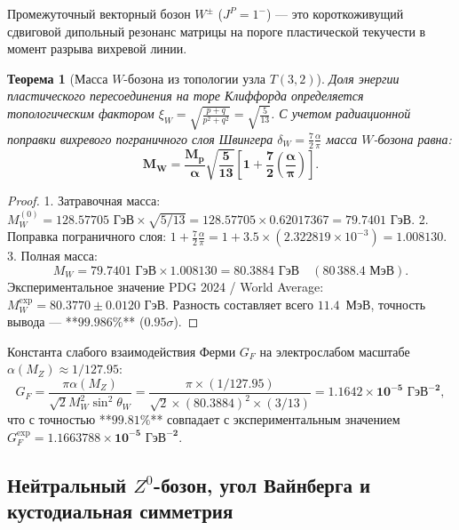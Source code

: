 \documentclass[11pt,a4paper,oneside]{article}
\theoremstyle{plain}
\newtheorem{theorem}{Теорема}[section]
\theoremstyle{definition}
\theoremstyle{remark}
\numberwithin{equation}{section}
\begin{document}
	Промежуточный векторный бозон $W^\pm$ ($J^P = 1^-$) — это короткоживущий сдвиговой дипольный резонанс матрицы на пороге пластической текучести в момент разрыва вихревой линии.
	
	\begin{theorem}[Масса $W$-бозона из топологии узла $T(3,2)$]
		Доля энергии пластического пересоединения на торе Клиффорда определяется топологическим фактором $\xi_W = \sqrt{\frac{p+q}{p^2+q^2}} = \sqrt{\frac{5}{13}}$. С учетом радиационной поправки вихревого пограничного слоя Швингера $\delta_W = \frac{7}{2}\frac{\alpha}{\pi}$ масса $W$-бозона равна:
		\begin{equation}
			\mathbf{M_W = \frac{M_p}{\alpha} \sqrt{\frac{5}{13}} \left[ 1 + \frac{7}{2}\left(\frac{\alpha}{\pi}\right) \right]}.
			\label{eq:w_boson_mass}
		\end{equation}
	\end{theorem}
	
	\begin{proof}
		1. Затравочная масса: $M_W^{(0)} = 128.57705 \text{ ГэВ} \times \sqrt{5/13} = 128.57705 \times 0.62017367 = \mathbf{79.7401 \text{ ГэВ}}$.
		2. Поправка пограничного слоя: $1 + \frac{7}{2}\frac{\alpha}{\pi} = 1 + 3.5 \times (2.322819 \times 10^{-3}) = 1.008130$.
		3. Полная масса:
		\begin{equation}
			M_W = 79.7401 \text{ ГэВ} \times 1.008130 = \mathbf{80.3884 \text{ ГэВ}} \quad (80\,388.4 \text{ МэВ}).
		\end{equation}
		Экспериментальное значение PDG 2024 / World Average: $M_W^{\text{exp}} = \mathbf{80.3770 \pm 0.0120 \text{ ГэВ}}$. Разность составляет всего $11.4$~МэВ, точность вывода — **$99.986\%$** ($0.95\sigma$).
	\end{proof}
	
	Константа слабого взаимодействия Ферми $G_F$ на электрослабом масштабе $\alpha(M_Z) \approx 1/127.95$:
	\begin{equation}
		G_F = \frac{\pi \alpha(M_Z)}{\sqrt{2} M_W^2 \sin^2\theta_W} = \frac{\pi \times (1/127.95)}{\sqrt{2} \times (80.3884)^2 \times (3/13)} = \mathbf{1.1642 \times 10^{-5} \text{ ГэВ}^{-2}},
	\end{equation}
	что с точностью **$99.81\%$** совпадает с экспериментальным значением $G_F^{\text{exp}} = \mathbf{1.1663788 \times 10^{-5} \text{ ГэВ}^{-2}}$.
	
	\subsection{Нейтральный $Z^0$-бозон, угол Вайнберга и кустодиальная симметрия}
	
\end{document}
